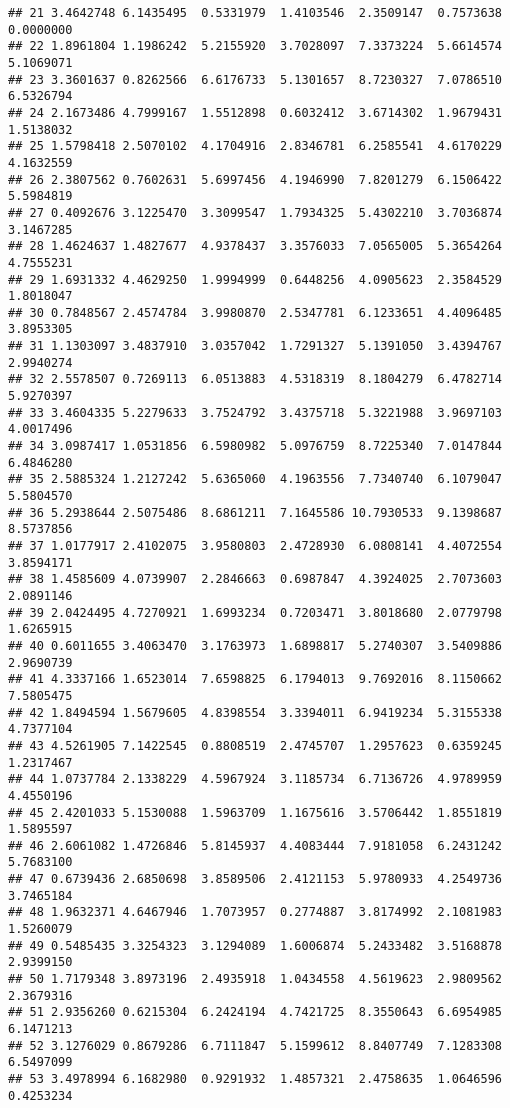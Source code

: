 \documentclass[
]{article}
\begin{document}
\begin{verbatim}
## 21 3.4642748 6.1435495  0.5331979  1.4103546  2.3509147  0.7573638  0.0000000
## 22 1.8961804 1.1986242  5.2155920  3.7028097  7.3373224  5.6614574  5.1069071
## 23 3.3601637 0.8262566  6.6176733  5.1301657  8.7230327  7.0786510  6.5326794
## 24 2.1673486 4.7999167  1.5512898  0.6032412  3.6714302  1.9679431  1.5138032
## 25 1.5798418 2.5070102  4.1704916  2.8346781  6.2585541  4.6170229  4.1632559
## 26 2.3807562 0.7602631  5.6997456  4.1946990  7.8201279  6.1506422  5.5984819
## 27 0.4092676 3.1225470  3.3099547  1.7934325  5.4302210  3.7036874  3.1467285
## 28 1.4624637 1.4827677  4.9378437  3.3576033  7.0565005  5.3654264  4.7555231
## 29 1.6931332 4.4629250  1.9994999  0.6448256  4.0905623  2.3584529  1.8018047
## 30 0.7848567 2.4574784  3.9980870  2.5347781  6.1233651  4.4096485  3.8953305
## 31 1.1303097 3.4837910  3.0357042  1.7291327  5.1391050  3.4394767  2.9940274
## 32 2.5578507 0.7269113  6.0513883  4.5318319  8.1804279  6.4782714  5.9270397
## 33 3.4604335 5.2279633  3.7524792  3.4375718  5.3221988  3.9697103  4.0017496
## 34 3.0987417 1.0531856  6.5980982  5.0976759  8.7225340  7.0147844  6.4846280
## 35 2.5885324 1.2127242  5.6365060  4.1963556  7.7340740  6.1079047  5.5804570
## 36 5.2938644 2.5075486  8.6861211  7.1645586 10.7930533  9.1398687  8.5737856
## 37 1.0177917 2.4102075  3.9580803  2.4728930  6.0808141  4.4072554  3.8594171
## 38 1.4585609 4.0739907  2.2846663  0.6987847  4.3924025  2.7073603  2.0891146
## 39 2.0424495 4.7270921  1.6993234  0.7203471  3.8018680  2.0779798  1.6265915
## 40 0.6011655 3.4063470  3.1763973  1.6898817  5.2740307  3.5409886  2.9690739
## 41 4.3337166 1.6523014  7.6598825  6.1794013  9.7692016  8.1150662  7.5805475
## 42 1.8494594 1.5679605  4.8398554  3.3394011  6.9419234  5.3155338  4.7377104
## 43 4.5261905 7.1422545  0.8808519  2.4745707  1.2957623  0.6359245  1.2317467
## 44 1.0737784 2.1338229  4.5967924  3.1185734  6.7136726  4.9789959  4.4550196
## 45 2.4201033 5.1530088  1.5963709  1.1675616  3.5706442  1.8551819  1.5895597
## 46 2.6061082 1.4726846  5.8145937  4.4083444  7.9181058  6.2431242  5.7683100
## 47 0.6739436 2.6850698  3.8589506  2.4121153  5.9780933  4.2549736  3.7465184
## 48 1.9632371 4.6467946  1.7073957  0.2774887  3.8174992  2.1081983  1.5260079
## 49 0.5485435 3.3254323  3.1294089  1.6006874  5.2433482  3.5168878  2.9399150
## 50 1.7179348 3.8973196  2.4935918  1.0434558  4.5619623  2.9809562  2.3679316
## 51 2.9356260 0.6215304  6.2424194  4.7421725  8.3550643  6.6954985  6.1471213
## 52 3.1276029 0.8679286  6.7111847  5.1599612  8.8407749  7.1283308  6.5497099
## 53 3.4978994 6.1682980  0.9291932  1.4857321  2.4758635  1.0646596  0.4253234

\end{verbatim}
\end{document}
